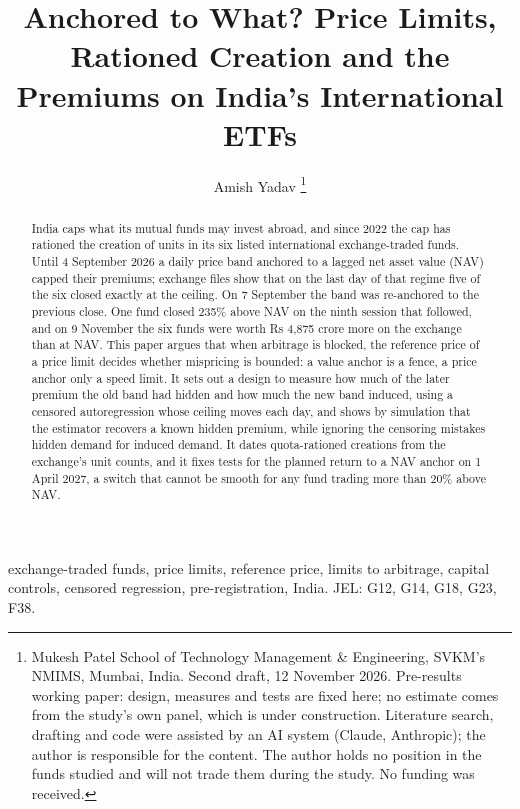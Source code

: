 \documentclass[10pt,journal,a4paper]{IEEEtran}
\theoremstyle{definition}
\begin{document}
\title{Anchored to What? Price Limits, Rationed Creation and the Premiums on India's International ETFs}
\author{Amish Yadav%
\thanks{Mukesh Patel School of Technology Management \& Engineering, SVKM's NMIMS, Mumbai, India. Second draft, 12 November 2026. Pre-results working paper: design, measures and tests are fixed here; no estimate comes from the study's own panel, which is under construction. Literature search, drafting and code were assisted by an AI system (Claude, Anthropic); the author is responsible for the content. The author holds no position in the funds studied and will not trade them during the study. No funding was received.}}
\maketitle
\begin{abstract}
India caps what its mutual funds may invest abroad, and since 2022 the cap has rationed the creation of units in its six listed international exchange-traded funds. Until 4 September 2026 a daily price band anchored to a lagged net asset value (NAV) capped their premiums; exchange files show that on the last day of that regime five of the six closed exactly at the ceiling. On 7 September the band was re-anchored to the previous close. One fund closed 235\% above NAV on the ninth session that followed, and on 9 November the six funds were worth Rs 4,875 crore more on the exchange than at NAV. This paper argues that when arbitrage is blocked, the reference price of a price limit decides whether mispricing is bounded: a value anchor is a fence, a price anchor only a speed limit. It sets out a design to measure how much of the later premium the old band had hidden and how much the new band induced, using a censored autoregression whose ceiling moves each day, and shows by simulation that the estimator recovers a known hidden premium, while ignoring the censoring mistakes hidden demand for induced demand. It dates quota-rationed creations from the exchange's unit counts, and it fixes tests for the planned return to a NAV anchor on 1 April 2027, a switch that cannot be smooth for any fund trading more than 20\% above NAV.
\end{abstract}
\begin{IEEEkeywords}
exchange-traded funds, price limits, reference price, limits to arbitrage, capital controls, censored regression, pre-registration, India. JEL: G12, G14, G18, G23, F38.
\end{IEEEkeywords}
\end{document}
